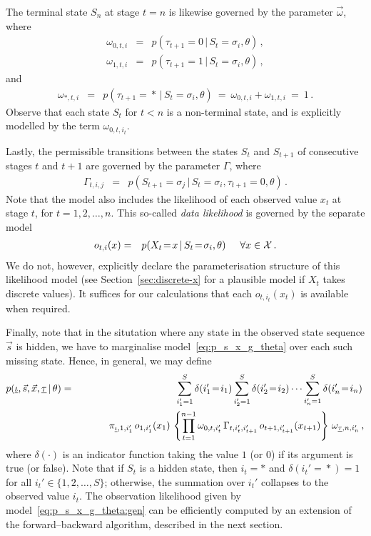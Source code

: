 \documentclass[a4paper]{article}
\begin{document}
The terminal state $S_n$ at stage $t=n$ is likewise governed by the parameter $\vec{\omega}$, where
\begin{eqnarray}
  \omega_{0,t,i} & = & p(\tau_{t+1}\!=\!0\,|\,S_t\!=\!\sigma_{i},\theta)\,,
\\
  \omega_{1,t,i} & = & p(\tau_{t+1}\!=\!1\,|\,S_t\!=\!\sigma_{i},\theta)\,,
\end{eqnarray}
and
\begin{eqnarray}
  \omega_{*,t,i} & = & p(\tau_{t+1}\!=\!*\,|\,S_t\!=\!\sigma_{i},\theta)
~=~\omega_{0,t,i}+\omega_{1,t,i}~=~1\,.
\end{eqnarray}
Observe that each state $S_t$ for $t<n$ is a non-terminal state, and is explicitly modelled by the term
$\omega_{0,t,i_t}$.

Lastly, the permissible transitions between the states $S_t$ and $S_{t+1}$ of consecutive stages $t$ and $t+1$ are governed by
the parameter $\Gamma$, where
\begin{eqnarray}
  \Gamma_{t,i,j} & = & p(S_{t+1}\!=\!\sigma_{j}\,|\,S_t\!=\!\sigma_{i},\tau_{t+1}\!=\!0,\theta)\,.
\end{eqnarray}
Note that the model also includes the likelihood of each observed value $x_t$ at stage $t$, for $t=1,2,\ldots,n$.
This so-called {\em data likelihood} is governed by the separate model
\begin{eqnarray}
  o_{t,i}(x) & = & p(X_t\!=\!x\,|\,S_t\!=\!\sigma_{i},\theta) \hspace*{5mm}\forall x\in{\cal X}\,.
\end{eqnarray}
We do not, however, explicitly declare the parameterisation structure of this likelihood model (see Section~\ref{sec:discrete-x} for a plausible model if $X_t$ takes discrete values). 
It suffices for our calculations that each $o_{t,i_t}(x_t)$ is available when required.

Finally, note that in the situtation where any state in the observed state sequence $\vec{s}$ is hidden, we have to marginalise model~\eqref{eq:p_s_x_g_theta} over each such missing state. Hence, in general, we may define
\begin{eqnarray}
   p(\underline{\iota},\vec{s},\vec{x},\underline{\tau}\,|\,\theta) 
& = & 
   \sum_{i_1'=1}^{S}\delta(i_1'\!=\!i_1)\sum_{i_2'=1}^{S}\delta(i_2'\!=\!i_2)\cdots\sum_{i_n'=1}^{S}\delta(i_n'\!=\!i_n)\,
\nonumber\\&&\hspace*{10mm}\pi_{\underline{\iota},1,i_1'}\,o_{1,i_1'}(x_1)\,
\left\{\prod_{t=1}^{n-1}\omega_{0,t,i_t'}\,\Gamma_{t,i_t',i_{t+1}'}\,o_{t+1,i_{t+1}'}(x_{t+1})
\right\}\,\omega_{\underline{\tau},n,i_n'}
\,,
\label{eq:p_s_x_g_theta:gen}
\end{eqnarray}
where $\delta(\cdot)$ is an indicator function taking the value $1$ (or $0$) if its argument is true (or false).
Note that if $S_t$ is a hidden state, then $i_t=*$ and $\delta(i_t'\!=\!*)=1$ for all $i_t'\in\{1,2,\ldots,S\}$; otherwise, the summation over $i_t'$ collapses to the observed value $i_t$.
The observation likelihood given by model~\eqref{eq:p_s_x_g_theta:gen} can be efficiently computed by an
extension of the forward--backward algorithm, described in the next section.
\end{document}
